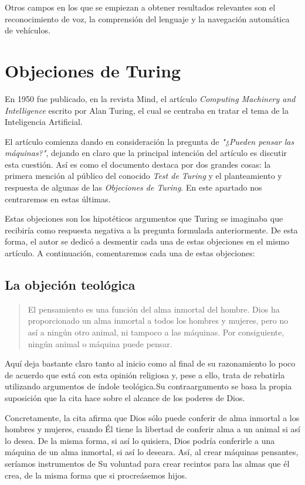\documentclass[12pt,a4paper]{article}
\begin{document}
Otros campos en los que se empiezan a obtener resultados relevantes son el reconocimiento de voz, la comprensión del lenguaje y la navegación automática de vehículos.

\section{Objeciones de Turing}
En 1950 fue publicado, en la revista Mind, el artículo \emph{Computing Machinery and Intelligence} escrito por Alan Turing, el cual se centraba en tratar el tema de la Inteligencia Artificial.

El artículo comienza dando en consideración la pregunta de \emph{"¿Pueden pensar las máquinas?"}, dejando en claro que la principal intención del artículo es discutir esta cuestión. Así es como el documento destaca por dos grandes cosas: la primera mención al público del conocido \emph{Test de Turing} y el planteamiento y respuesta de algunas de las \emph{Objeciones de Turing}. En este apartado nos centraremos en estas últimas.

Estas objeciones son los hipotéticos argumentos que Turing se imaginaba que recibiría como respuesta negativa a la pregunta formulada anteriormente. De esta forma, el autor se dedicó a desmentir cada una de estas objeciones en el mismo artículo. A continuación, comentaremos cada una de estas objeciones:

\subsection{La objeción teológica}

\begin{quote}\small El pensamiento es una función del alma inmortal del hombre. Dios ha proporcionado un alma inmortal a todos los hombres y mujeres, pero no así a ningún otro animal, ni tampoco a las máquinas. Por consiguiente, ningún animal o máquina puede pensar.\end{quote}

Aquí deja bastante claro tanto al inicio como al final de su razonamiento lo poco de acuerdo que está con esta opinión religiosa y, pese a ello, trata de rebatirla utilizando argumentos de índole teológica.Su contraargumento se basa la propia suposición que la cita hace sobre el alcance de los poderes de Dios.

Concretamente, la cita afirma que Dios sólo puede conferir de alma inmortal a los hombres y mujeres, cuando Él tiene la libertad de conferir alma a un animal si así lo desea. De la misma forma, si así lo quisiera, Dios podría conferirle a una máquina de un alma inmortal, si así lo deseara. Así, al crear máquinas pensantes, seríamos instrumentos de Su voluntad para crear recintos para las almas que él crea, de la misma forma que si procreásemos hijos.
\end{document}
